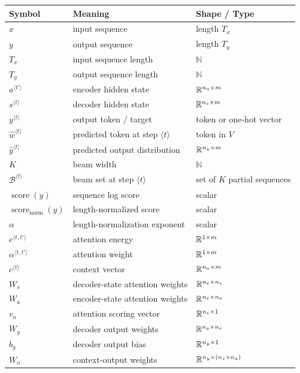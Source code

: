 \begin{center}
\begin{tabular}{lll}
\toprule
Symbol & Meaning & Shape / Type \\
\midrule
$x$ & input sequence & length $T_x$ \\
$y$ & output sequence & length $T_y$ \\
$T_x$ & input sequence length & $\mathbb{N}$ \\
$T_y$ & output sequence length & $\mathbb{N}$ \\
$a^{\langle t'\rangle}$ & encoder hidden state & $\mathbb{R}^{n_a \times m}$ \\
$s^{\langle t\rangle}$ & decoder hidden state & $\mathbb{R}^{n_s \times m}$ \\
$y^{\langle t\rangle}$ & output token / target & token or one-hot vector \\
$\hat{w}^{\langle t\rangle}$ & predicted token at step $\langle t\rangle$ & token in $V$ \\
$\hat{y}^{\langle t\rangle}$ & predicted output distribution & $\mathbb{R}^{n_y \times m}$ \\
$K$ & beam width & $\mathbb{N}$ \\
$\mathcal{B}^{\langle t\rangle}$ & beam set at step $\langle t\rangle$ & set of $K$ partial sequences \\
$\operatorname{score}(y)$ & sequence log score & scalar \\
$\operatorname{score}_{\mathrm{norm}}(y)$ & length-normalized score & scalar \\
$\alpha$ & length-normalization exponent & scalar \\
$e^{\langle t,t'\rangle}$ & attention energy & $\mathbb{R}^{1 \times m}$ \\
$\alpha^{\langle t,t'\rangle}$ & attention weight & $\mathbb{R}^{1 \times m}$ \\
$c^{\langle t\rangle}$ & context vector & $\mathbb{R}^{n_a \times m}$ \\
$W_s$ & decoder-state attention weights & $\mathbb{R}^{n_e \times n_s}$ \\
$W_a$ & encoder-state attention weights & $\mathbb{R}^{n_e \times n_a}$ \\
$v_a$ & attention scoring vector & $\mathbb{R}^{n_e \times 1}$ \\
$W_y$ & decoder output weights & $\mathbb{R}^{n_y \times n_s}$ \\
$b_y$ & decoder output bias & $\mathbb{R}^{n_y \times 1}$ \\
$W_o$ & context-output weights & $\mathbb{R}^{n_y \times (n_s+n_a)}$ \\

\end{tabular}
\end{center}
